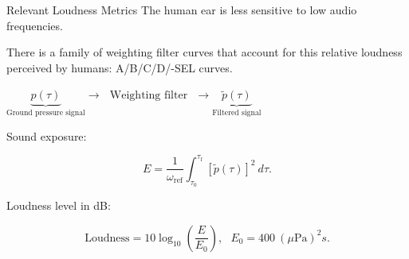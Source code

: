 \documentclass{beamer}
\newcounter{sectionframes}
\newcommand{\setsectionframes}[1]{%
  \setcounter{sectionframes}{#1}%
}
\newcounter{sectionframecount}
\begin{document}
\setsectionframes{3}


\begin{frame}[t]{Relevant Loudness Metrics}
\vspace{-10pt}
The human ear is less sensitive to low audio frequencies.

\vspace{10pt}
There is a family of weighting filter curves that account for this relative loudness perceived by humans: A/B/C/D/-SEL curves.

\vspace{10pt}
$\underbrace{p(\tau)}_{\text{Ground pressure signal}}\to~~~\text{Weighting filter}~~~\to\underbrace{\tilde{p}(\tau)}_{\text{Filtered signal}}$

\vspace{10pt}
Sound exposure:

\begin{equation}
  E = \dfrac{1}{\omega_{\text{ref}}}\int_{\tau_0}^{\tau_{\text{f}}} [\tilde{p}(\tau)]^2~d\tau.
\end{equation}

\vspace{10pt}
Loudness level in dB:

\begin{equation}
  \text{Loudness} = 10\log_{10}\left(\dfrac{E}{E_0}\right),~~~ E_0 = 400~ (\mu\text{Pa})^2s.
\end{equation}

\end{frame}

\end{document}
